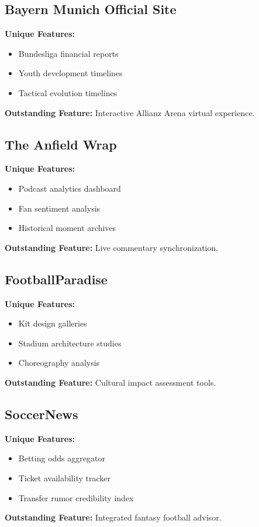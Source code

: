 \documentclass{report}
\begin{document}
\subsection{Bayern Munich Official Site}
\textbf{Unique Features:}
\begin{itemize}
    \item Bundesliga financial reports
    \item Youth development timelines
    \item Tactical evolution timelines
\end{itemize}
\textbf{Outstanding Feature:} Interactive Allianz Arena virtual experience\citep{bayern}.

\subsection{The Anfield Wrap}
\textbf{Unique Features:}
\begin{itemize}
    \item Podcast analytics dashboard
    \item Fan sentiment analysis
    \item Historical moment archives
\end{itemize}
\textbf{Outstanding Feature:} Live commentary synchronization\citep{anfieldwrap}.

\subsection{FootballParadise}
\textbf{Unique Features:}
\begin{itemize}
    \item Kit design galleries
    \item Stadium architecture studies
    \item Choreography analysis
\end{itemize}
\textbf{Outstanding Feature:} Cultural impact assessment tools\citep{footballparadise}.

\subsection{SoccerNews}
\textbf{Unique Features:}
\begin{itemize}
    \item Betting odds aggregator
    \item Ticket availability tracker
    \item Transfer rumor credibility index
\end{itemize}
\textbf{Outstanding Feature:} Integrated fantasy football advisor\citep{soccernews}.
\end{document}
